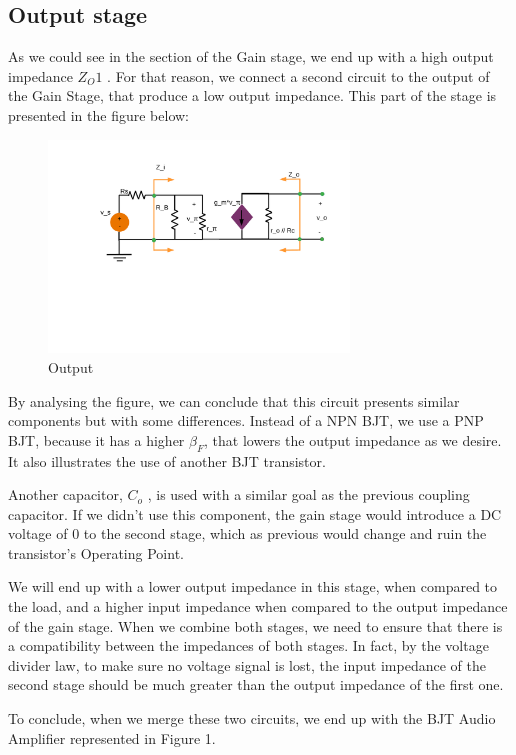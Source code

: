 \subsection{Output stage}

As we could see in the section of the Gain stage, we end up with a high output impedance $Z_O1$ . For that reason, we
connect a second circuit to the output of the Gain Stage, that produce a low output impedance.
This part of the stage is presented in the figure below:

\begin{figure}[H] 
\centering
\includegraphics[width = 8cm]{Incremental_Gain.pdf} 
\caption{Output}
\label{output}
\end{figure}

By analysing the figure, we can conclude that this circuit presents similar components but with some differences.
Instead of a NPN BJT, we use a PNP BJT, because it has a higher $\beta_F$, that lowers the
output impedance as we desire. It also illustrates the use of another BJT transistor. \par
Another capacitor, $C_o$ , is used with a similar goal as the previous coupling capacitor. If we
didn’t use this component, the gain stage would introduce a DC voltage of 0 to the second stage,
which as previous would change and ruin the transistor’s Operating Point. \par
We will end up with a lower output impedance in this stage, when compared to
the load, and a higher input impedance when compared to the output impedance of the gain
stage. When we combine both stages, we need to ensure that there is a compatibility between the
impedances of both stages. In fact, by the voltage divider law, to make sure no voltage signal is lost, the input
impedance of the second stage should be much greater than the output impedance of the first
one.\par
To conclude, when we merge these two circuits, we end up with the BJT Audio Amplifier represented in Figure 1.

